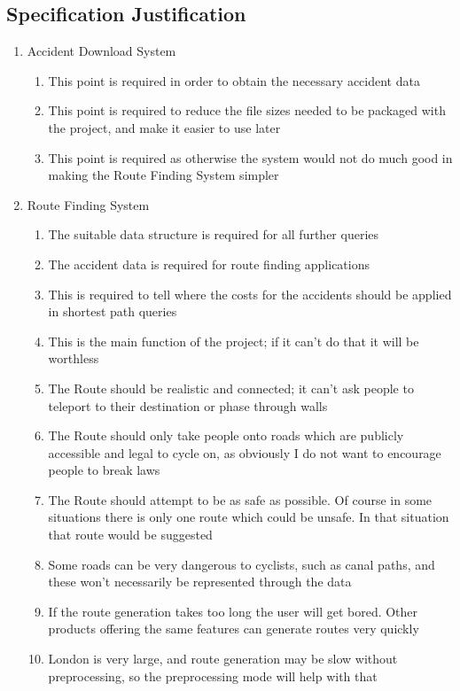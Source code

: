 \documentclass[11pt,twoside,a4paper]{article}
\begin{document}
\subsection{Specification Justification}
\begin{enumerate}
    \item Accident Download System
    \begin{enumerate}
        \item This point is required in order to obtain the necessary accident data
        \item This point is required to reduce the file sizes needed to be packaged with the project, and make it easier to use later
        \item This point is required as otherwise the system would not do much good in making the Route Finding System simpler
    \end{enumerate} 
    \item Route Finding System
    \begin{enumerate}
        \item The suitable data structure is required for all further queries
        \item The accident data is required for route finding applications
        \item This is required to tell where the costs for the accidents should be applied in shortest path queries
        \item This is the main function of the project; if it can't do that it will be worthless
        \item The Route should be realistic and connected; it can't ask people to teleport to their destination or phase through walls
        \item The Route should only take people onto roads which are publicly accessible and legal to cycle on, as obviously I do not want to encourage people to break laws
        \item The Route should attempt to be as safe as possible. Of course in some situations there is only one route which could be unsafe. In that situation that route would be suggested
        \item Some roads can be very dangerous to cyclists, such as canal paths, and these won't necessarily be represented through the data
        \item If the route generation takes too long the user will get bored. Other products offering the same features can generate routes very quickly
        \item London is very large, and route generation may be slow without preprocessing, so the preprocessing mode will help with that

\end{enumerate}
\end{enumerate}
\end{document}

